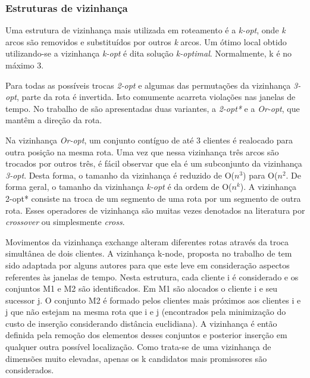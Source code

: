 \subsubsection{Estruturas de vizinhança}

Uma estrutura de vizinhança mais utilizada em roteamento é a \textit{k-opt}, onde \textit{k} arcos são removidos e substituídos por outros \textit{k} arcos. Um ótimo local obtido utilizando-se a vizinhança \textit{k-opt} é dita solução \textit{k-optimal}. Normalmente, k é no máximo 3.

Para todas as possíveis trocas \textit{2-opt} e algumas das permutações da vizinhança \textit{3-opt}, parte da rota é invertida. Isto comumente acarreta violações nas janelas de tempo. No trabalho de \cite{Potvin} são apresentadas duas variantes, a \textit{2-opt*}  e a \textit{Or-opt}, que mantêm a direção da rota.

Na vizinhança \textit{Or-opt}, um conjunto contíguo de até 3 clientes é realocado para outra posição na mesma rota. Uma vez que nessa vizinhança três arcos são trocados por outros três, é fácil observar que ela é um subconjunto da vizinhança \textit{3-opt}. Desta forma, o tamanho da vizinhança é reduzido de O(\(n^3\)) para O(\(n^2\). De forma geral, o tamanho da vizinhança \textit{k-opt}  é da ordem de O(\(n^k\)). A vizinhança 2-opt* consiste na troca de um
segmento de uma rota por um segmento de outra rota. Esses operadores de vizinhança são muitas vezes denotados na literatura por \textit{crossover} ou simplesmente \textit{cross}.

Movimentos da vizinhança exchange alteram diferentes rotas através da troca simultânea
de dois clientes. A vizinhança k-node, proposta no trabalho de \cite{Christofides} tem sido adaptada por alguns autores para que este leve em consideração aspectos referentes às janelas de tempo. Nesta estrutura, cada cliente i é considerado e os conjuntos M1 e M2 são identificados. Em M1 são alocados o cliente i e seu sucessor j. O conjunto M2 é formado pelos clientes mais próximos aos clientes i e j que não estejam na mesma rota que i e j (encontrados pela minimização do custo de inserção considerando distância euclidiana). A vizinhança é então definida pela remoção dos elementos desses conjuntos e posterior inserção em qualquer outra possível localização. Como trata-se de uma vizinhança de dimensões muito elevadas, apenas os k candidatos mais promissores são considerados. 

